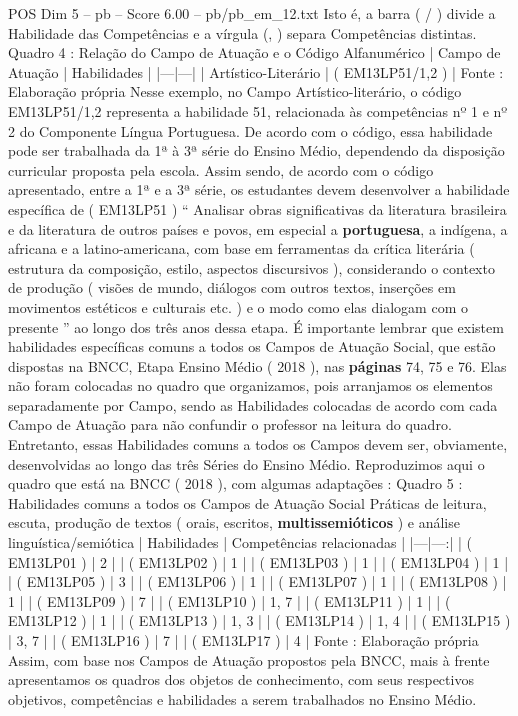 \begin{textsample}{POS Dim 5 – pb – Score 6.00 – pb/pb\_em\_12.txt}
Isto é, a barra ( / ) divide a Habilidade das Competências e a vírgula (, ) separa Competências distintas.
Quadro 4 : Relação do Campo de Atuação e o Código Alfanumérico | Campo de Atuação | Habilidades | |---|---| | Artístico-Literário | ( EM13LP51/1,2 ) | Fonte : Elaboração própria Nesse exemplo, no Campo Artístico-literário, o código EM13LP51/1,2 representa a habilidade 51, relacionada às competências nº 1 e nº 2 do Componente Língua Portuguesa.
De acordo com o código, essa habilidade pode ser trabalhada da 1ª à 3ª série do Ensino Médio, dependendo da disposição curricular proposta pela escola.
Assim sendo, de acordo com o código apresentado, entre a 1ª e a 3ª série, os estudantes devem desenvolver a habilidade específica de ( EM13LP51 ) “ Analisar obras significativas da literatura brasileira e da literatura de outros países e povos, em especial a \textbf{portuguesa}, a indígena, a africana e a latino-americana, com base em ferramentas da crítica literária ( estrutura da composição, estilo, aspectos discursivos ), considerando o contexto de produção ( visões de mundo, diálogos com outros textos, inserções em movimentos estéticos e culturais etc. ) e o modo como elas dialogam com o presente ” ao longo dos três anos dessa etapa.
É importante lembrar que existem habilidades específicas comuns a todos os Campos de Atuação Social, que estão dispostas na BNCC, Etapa Ensino Médio ( 2018 ), nas \textbf{páginas} 74, 75 e 76.
Elas não foram colocadas no quadro que organizamos, pois arranjamos os elementos separadamente por Campo, sendo as Habilidades colocadas de acordo com cada Campo de Atuação para não confundir o professor na leitura do quadro.
Entretanto, essas Habilidades comuns a todos os Campos devem ser, obviamente, desenvolvidas ao longo das três Séries do Ensino Médio.
Reproduzimos aqui o quadro que está na BNCC ( 2018 ), com algumas adaptações : Quadro 5 : Habilidades comuns a todos os Campos de Atuação Social Práticas de leitura, escuta, produção de textos ( orais, escritos, \textbf{multissemióticos} ) e análise linguística/semiótica | Habilidades | Competências relacionadas | |---|---:| | ( EM13LP01 ) | 2 | | ( EM13LP02 ) | 1 | | ( EM13LP03 ) | 1 | | ( EM13LP04 ) | 1 | | ( EM13LP05 ) | 3 | | ( EM13LP06 ) | 1 | | ( EM13LP07 ) | 1 | | ( EM13LP08 ) | 1 | | ( EM13LP09 ) | 7 | | ( EM13LP10 ) | 1, 7 | | ( EM13LP11 ) | 1 | | ( EM13LP12 ) | 1 | | ( EM13LP13 ) | 1, 3 | | ( EM13LP14 ) | 1, 4 | | ( EM13LP15 ) | 3, 7 | | ( EM13LP16 ) | 7 | | ( EM13LP17 ) | 4 | Fonte : Elaboração própria Assim, com base nos Campos de Atuação propostos pela BNCC, mais à frente apresentamos os quadros dos objetos de conhecimento, com seus respectivos objetivos, competências e habilidades a serem trabalhados no Ensino Médio.

\end{textsample}
